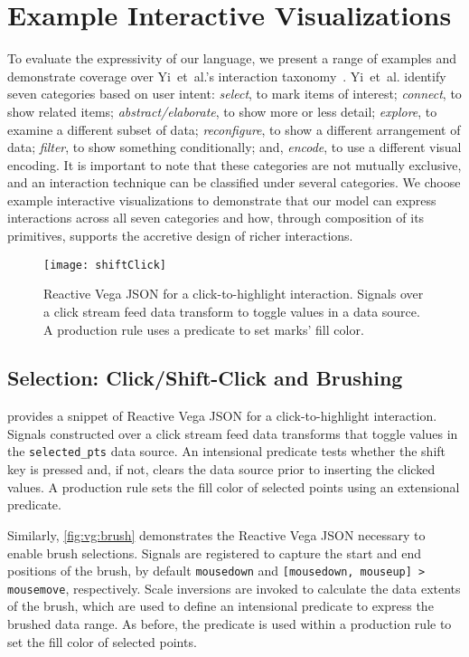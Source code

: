 \section{Example Interactive Visualizations}
\label{sec:vg:examples}

To evaluate the expressivity of our language, we present a range of examples and
demonstrate coverage over Yi~et~al.'s interaction
taxonomy~\cite{yi:understanding}. Yi~et~al. identify seven categories based on
user intent: \emph{select}, to mark items of interest; \emph{connect}, to show
related items; \emph{abstract/elaborate}, to show more or less detail;
\emph{explore}, to examine a different subset of data; \emph{reconfigure}, to
show a different arrangement of data; \emph{filter}, to show something
conditionally; and, \emph{encode}, to use a different visual encoding. It is
important to note that these categories are not mutually exclusive, and an
interaction technique can be classified under several categories. We choose
example interactive visualizations to demonstrate that our model can express
interactions across all seven categories and how, through composition of its
primitives, supports the accretive design of richer interactions.

\begin{figure}[h!]
  \centering
  \texttt{[image: shiftClick]}
  \caption{Reactive Vega JSON for a click-to-highlight interaction. Signals over
  a click stream feed data transform to toggle values in a data source. A
  production rule uses a predicate to set marks' fill color.}
  \label{fig:vg:shiftClick}
\end{figure}

\subsection{Selection: Click/Shift-Click and Brushing}

 provides a snippet of Reactive Vega JSON for a
click-to-highlight interaction. Signals constructed over a click stream feed
data transforms that toggle values in the \texttt{selected\_pts} data source. An
intensional predicate tests whether the shift key is pressed and, if not, clears
the data source prior to inserting the clicked values. A production rule sets
the fill color of selected points using an extensional predicate.

Similarly, \cref{fig:vg:brush} demonstrates the Reactive Vega JSON necessary to
enable brush selections. Signals are registered to capture the start and end
positions of the brush, by default \texttt{mousedown} and \texttt{[mousedown,
mouseup] > mousemove}, respectively. Scale inversions are invoked to calculate
the data extents of the brush, which are used to define an intensional predicate
to express the brushed data range. As before, the predicate is used within a
production rule to set the fill color of selected points.

